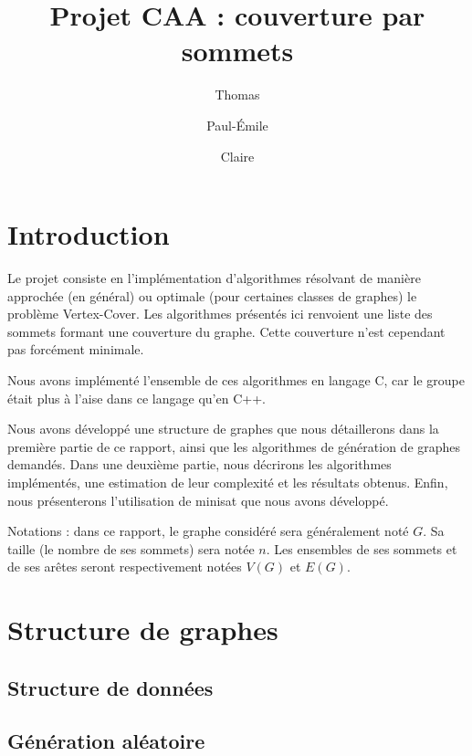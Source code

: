 \documentclass[a4paper,10pt]{article}
\title{Projet CAA : couverture par sommets}
\author{Thomas \bsc{Bellitto}\and Paul-Émile \bsc{Boutoille} \and Claire \bsc{Pennarun}}
\date{}
\begin{document}
\maketitle

\section*{Introduction}

Le projet consiste en l'implémentation d'algorithmes résolvant de manière approchée (en général) ou optimale (pour certaines classes de graphes) le problème Vertex-Cover.
Les algorithmes présentés ici renvoient une liste des sommets formant une couverture du graphe. Cette couverture n'est cependant pas forcément minimale.

Nous avons implémenté l'ensemble de ces algorithmes en langage C, car le groupe était plus à l'aise dans ce langage qu'en C++.

Nous avons développé une structure de graphes que nous détaillerons dans la première partie de ce rapport, ainsi que les algorithmes de génération de graphes demandés.
Dans une deuxième partie, nous décrirons les algorithmes implémentés, une estimation de leur complexité et les résultats obtenus.
Enfin, nous présenterons l'utilisation de minisat que nous avons développé.

Notations : dans ce rapport, le graphe considéré sera généralement noté $G$. Sa taille (le nombre de ses sommets) sera notée $n$. Les ensembles de ses sommets et de ses arêtes seront respectivement notées $V(G)$ et $E(G)$.

\section{Structure de graphes}

\subsection{Structure de données}


\subsection{Génération aléatoire}

\end{document}
